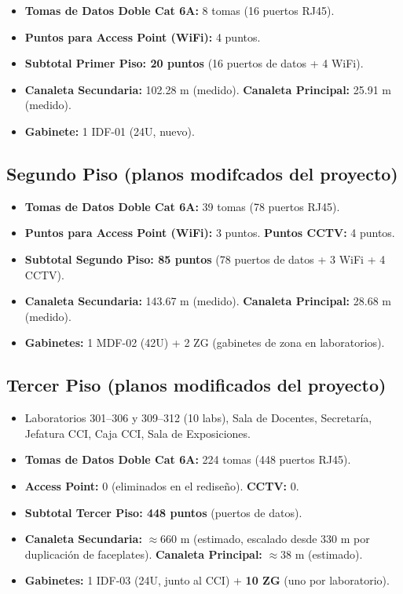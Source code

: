 \begin{itemize}
    \item \textbf{Tomas de Datos Doble Cat 6A:} 8 tomas (16 puertos RJ45).
    \item \textbf{Puntos para Access Point (WiFi):} 4 puntos.
    \item \textbf{Subtotal Primer Piso: 20 puntos} (16 puertos de datos + 4 WiFi).
    \item \textbf{Canaleta Secundaria:} 102.28 m (medido). \textbf{Canaleta Principal:} 25.91 m (medido).
    \item \textbf{Gabinete:} 1 IDF-01 (24U, nuevo).
\end{itemize}

\subsection*{Segundo Piso (planos modifcados del proyecto)}

\begin{itemize}
    \item \textbf{Tomas de Datos Doble Cat 6A:} 39 tomas (78 puertos RJ45).
    \item \textbf{Puntos para Access Point (WiFi):} 3 puntos. \textbf{Puntos CCTV:} 4 puntos.
    \item \textbf{Subtotal Segundo Piso: 85 puntos} (78 puertos de datos + 3 WiFi + 4 CCTV).
    \item \textbf{Canaleta Secundaria:} 143.67 m (medido). \textbf{Canaleta Principal:} 28.68 m (medido).
    \item \textbf{Gabinetes:} 1 MDF-02 (42U) + 2 ZG (gabinetes de zona en laboratorios).
\end{itemize}

\subsection*{Tercer Piso (planos modificados del proyecto)}

\begin{itemize}
    \item Laboratorios 301--306 y 309--312 (10 labs), Sala de Docentes, Secretaría,
          Jefatura CCI, Caja CCI, Sala de Exposiciones.
    \item \textbf{Tomas de Datos Doble Cat 6A:} 224 tomas (448 puertos RJ45).
    \item \textbf{Access Point:} 0 (eliminados en el rediseño). \textbf{CCTV:} 0.
    \item \textbf{Subtotal Tercer Piso: 448 puntos} (puertos de datos).
    \item \textbf{Canaleta Secundaria:} $\approx$660 m (estimado, escalado desde 330 m por duplicación de faceplates).
          \textbf{Canaleta Principal:} $\approx$38 m (estimado).
    \item \textbf{Gabinetes:} 1 IDF-03 (24U, junto al CCI) + \textbf{10 ZG} (uno por laboratorio).
\end{itemize}

